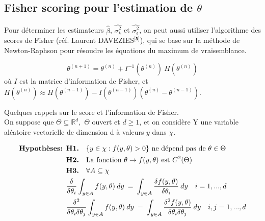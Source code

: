 \documentclass[11pt,fleqn]{book} %
\begin{document}
	\vspace{4em}
	
	\subsection{Fisher scoring pour l'estimation de $\theta$}
	
	\vspace{1em}
	
	Pour déterminer les estimateurs $\hat{\beta}$, $\hat{\sigma_k^2}$ et $\hat{\sigma_{\epsilon}^2}$, on peut aussi utiliser l'algorithme des scores de Fisher (réf. Laurent DAVEZIES$^\textbf{[5]}$), qui se base sur la méthode de Newton-Raphson pour résoudre les équations du maximum de vraisemblance. 
	
	\[
	\theta^{(n+1)} = \theta^{(n)} + I^{-1}(\theta^{(n)}) \:H(\theta^{(n)}) 
	\]
	où $I$ est la matrice d'information de Fisher, et  $H(\theta^{(n)})\approx H(\theta^{(n-1)})-I(\theta^{(n-1)})(\theta^{(n)}-\theta^{(n-1)}).$ 
	
	\vspace{1em}
	
	Quelques rappels sur le score et l'information de Fisher.\\
	
	On suppose que $\Theta\subseteq \mathbb{R}^d,$ $\Theta$ ouvert et $d\geq 1$, et on considère Y une variable aléatoire vectorielle de dimension d à valeurs $y$ dans $\chi$.
	
	\vspace{0.5em}
	
	\begin{align*}
		\textbf{Hypothèses: } &\textbf{H1.} \quad \{ y\in\chi : f(y,\theta)>0\} \textnormal{ ne dépend pas de } \theta\in\Theta\\
		&\textbf{H2.} \quad \textnormal{La fonction } \theta\rightarrow f(y,\theta) \textnormal{ est } C^2(\Theta)\\
		&\textbf{H3.} \quad \forall A \subseteq \chi\\ 
		& \frac{\delta}{\delta\theta_i} \int_{y\in A} f(y,\theta)\: dy \:=\: \int_{y\in A} \frac{\delta f(y,\theta)}{\delta\theta_i} \:dy  \quad i=1,...,d\\
		& \frac{\delta^2}{\delta\theta_i\delta\theta_j} \int_{y\in A} f(y,\theta)\: dy \:=\: \int_{y\in A} \frac{\delta^2  f(y,\theta)}{\delta\theta_i\delta\theta_j}\: dy \quad i,j=1,...,d
	\end{align*}
	
	\newpage 
	
\end{document}
